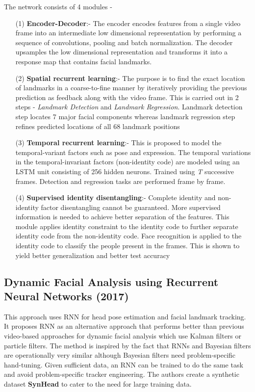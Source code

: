 \documentclass{llncs}
\begin{document}
The network consists of 4 modules -
\begin{itemize}
\item[(1)] \textbf{Encoder-Decoder}:-
The encoder encodes features from a single video frame into an intermediate low dimensional representation by performing a sequence of convolutions, pooling and batch normalization. The decoder upsamples the low dimensional representation and transforms it into a response map that contains facial landmarks.


\item[(2)] \textbf{Spatial recurrent learning}:-
The purpose is to find the exact location of landmarks in a coarse-to-fine manner by iteratively providing the previous prediction as feedback along with the video frame. This is carried out in 2 steps - \textit{Landmark Detection} and \textit{Landmark Regression}. Landmark detection step locates 7 major facial components whereas landmark regression step refines predicted locations of all 68 landmark positions

\item[(3)] \textbf{Temporal recurrent learning}:-
This is proposed to model the temporal-variant factors such as pose and expression. The temporal variations in the temporal-invariant factors (non-identity code) are modeled using an LSTM unit consisting of 256 hidden neurons.
Trained using \textit{T} successive frames. Detection and regression tasks are performed frame by frame. 


\item[(4)] \textbf{Supervised identity disentangling}:-
Complete identity and non-identity factor disentangling cannot be guaranteed. More supervised information is needed to achieve better separation of the features. This module applies identity constraint to the identity code to further separate identity code from the non-identity code. Face recognition is applied to the identity code to classify the people present in the frames. This is shown to yield better generalization and better test accuracy\\
\end{itemize}
 

\subsection{Dynamic Facial Analysis using Recurrent Neural Networks (2017) \cite{dynamic_facial_analysis}}

This approach uses RNN for head pose estimation and facial landmark tracking. 
It proposes RNN as an alternative approach that performs better than previous video-based approaches for dynamic facial analysis which use Kalman filters or particle filters. The method is inspired by the fact that RNNs and Bayesian filters are operationally very similar although  Bayesian filters need problem-specific hand-tuning. Given sufficient data, an RNN can be trained to do the same task and avoid problem-specific tracker engineering. 
The authors create a synthetic dataset \textbf{SynHead} to cater to the need for large training data. 
\end{document}
